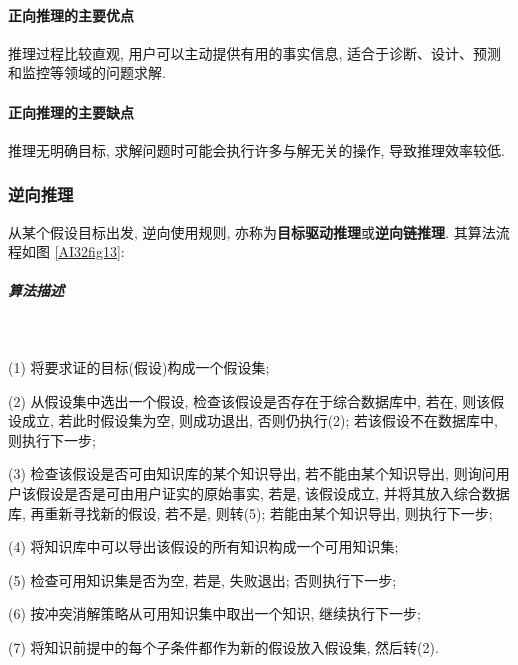 \paragraph{正向推理的主要优点}
推理过程比较直观, 用户可以主动提供有用的事实信息, 适合于诊断、设计、预测和监控等领域的问题求解.
\paragraph{正向推理的主要缺点}
推理无明确目标, 求解问题时可能会执行许多与解无关的操作, 导致推理效率较低.
\subsubsection{逆向推理}

从某个假设目标出发, 逆向使用规则, 亦称为\textbf{目标驱动推理}或\textbf{逆向链推理}.
其算法流程如图 \ref{AI32fig13}:
\subparagraph{算法描述}~{}

(1) 将要求证的目标(假设)构成一个假设集;

(2) 从假设集中选出一个假设, 检查该假设是否存在于综合数据库中, 若在, 则该假设成立, 若此时假设集为空, 则成功退出, 否则仍执行(2); 若该假设不在数据库中, 则执行下一步;

(3) 检查该假设是否可由知识库的某个知识导出, 若不能由某个知识导出, 则询问用户该假设是否是可由用户证实的原始事实, 若是, 该假设成立, 并将其放入综合数据库, 再重新寻找新的假设, 若不是, 则转(5); 若能由某个知识导出, 则执行下一步;

(4) 将知识库中可以导出该假设的所有知识构成一个可用知识集;

(5) 检查可用知识集是否为空, 若是, 失败退出; 否则执行下一步;

(6) 按冲突消解策略从可用知识集中取出一个知识, 继续执行下一步;

(7) 将知识前提中的每个子条件都作为新的假设放入假设集, 然后转(2).


